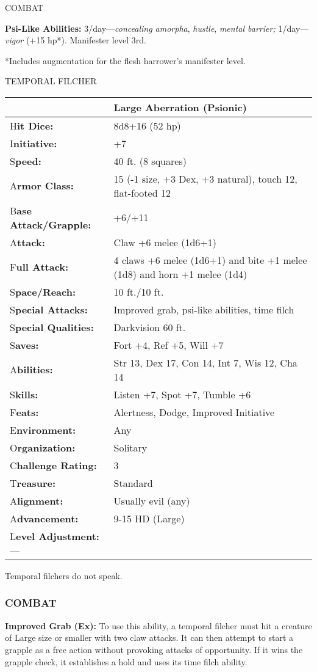 \documentclass{article}
\begin{document}
COMBAT

\textbf{Psi-Like Abilities:} 3/day---\textit{concealing amorpha}, \textit{hustle}, 
\textit{mental barrier; }1/day---\textit{vigor }(+15 hp*). Manifester level 3rd. 

*Includes augmentation for the flesh harrower's manifester level.

\vspace{12pt}
{\LARGE{}TEMPORAL FILCHER}

\begin{tabular}{|>{\raggedright}p{76pt}|>{\raggedright}p{249pt}|}
\hline
  & Large Aberration (Psionic)\tabularnewline
\hline
H\textbf{it Dice:} & 8d8+16 (52 hp)\tabularnewline
\hline
I\textbf{nitiative:} & +7\tabularnewline
\hline
S\textbf{peed:} & 40 ft. (8 squares)\tabularnewline
\hline
A\textbf{rmor Class:} & 15 (-1 size, +3 Dex, +3 natural), touch 12, flat-footed 
12\tabularnewline
\hline
B\textbf{ase Attack/Grapple:} & +6/+11\tabularnewline
\hline
A\textbf{ttack:} & Claw +6 melee (1d6+1)\tabularnewline
\hline
F\textbf{ull Attack:} & 4 claws +6 melee (1d6+1) and bite +1 melee (1d8) and horn 
+1 melee (1d4)\tabularnewline
\hline
S\textbf{pace/Reach:} & 10 ft./10 ft.\tabularnewline
\hline
S\textbf{pecial Attacks:} & Improved grab, psi-like abilities, time filch\tabularnewline
\hline
S\textbf{pecial Qualities:} & Darkvision 60 ft.\tabularnewline
\hline
S\textbf{aves:} & Fort +4, Ref +5, Will +7\tabularnewline
\hline
A\textbf{bilities:} & Str 13, Dex 17, Con 14, Int 7, Wis 12, Cha 14\tabularnewline
\hline
S\textbf{kills:} & Listen +7, Spot +7, Tumble +6\tabularnewline
\hline
F\textbf{eats:} & Alertness, Dodge, Improved Initiative\tabularnewline
\hline
E\textbf{nvironment:} & Any\tabularnewline
\hline
O\textbf{rganization:} & Solitary\tabularnewline
\hline
C\textbf{hallenge Rating:} & 3\tabularnewline
\hline
T\textbf{reasure:} & Standard\tabularnewline
\hline
A\textbf{lignment:} & Usually evil (any)\tabularnewline
\hline
A\textbf{dvancement:} & 9-15 HD (Large)\tabularnewline
\hline
L\textbf{evel Adjustment:}--- & \tabularnewline
\hline
\end{tabular}

Temporal filchers do not speak.

\subsubsection*{COMBAT}

\textbf{Improved Grab (Ex):} To use this ability, a temporal filcher must hit a 
creature of Large size or smaller with two claw attacks. It can then attempt to 
start a grapple as a free action without provoking attacks of opportunity. If it 
wins the grapple check, it establishes a hold and uses its time filch ability.
\end{document}
